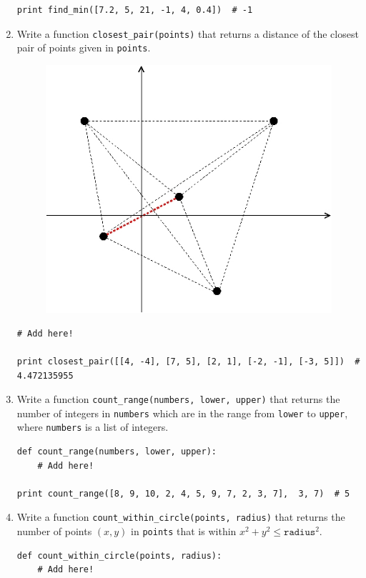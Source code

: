 \documentclass[../main.tex]{subfiles}
\begin{document}
\begin{enumerate}
\begin{verbatim}
print find_min([7.2, 5, 21, -1, 4, 0.4])  # -1
\end{verbatim}

\item Write a function \texttt{closest\_pair(points)} that returns a distance of the closest pair of points given in \texttt{points}.
\begin{figure}[H]
\centering
\includegraphics[width=0.5\linewidth]{"./lectures/lecture4_q8"}
\label{fig:lecture4q8}
\end{figure}
\begin{verbatim}
# Add here!

print closest_pair([[4, -4], [7, 5], [2, 1], [-2, -1], [-3, 5]])  # 4.472135955
\end{verbatim}

\item Write a function \texttt{count\_range(numbers, lower, upper)} that returns the number of integers in \texttt{numbers} which are in the range from \texttt{lower} to \texttt{upper}, where \texttt{numbers} is a list of integers.
\begin{verbatim}
def count_range(numbers, lower, upper):
    # Add here!

print count_range([8, 9, 10, 2, 4, 5, 9, 7, 2, 3, 7],  3, 7)  # 5
\end{verbatim}

\item Write a function \texttt{count\_within\_circle(points, radius)} that returns the number of points $(x, y)$ in \texttt{points} that is within $x^2 + y^2 \leq \texttt{radius}^2$.
\begin{verbatim}
def count_within_circle(points, radius):
    # Add here!


\end{verbatim}
\end{enumerate}
\end{document}
